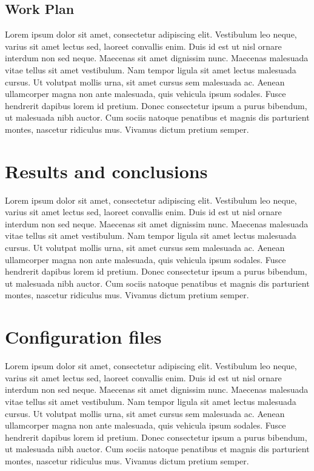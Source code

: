 \documentclass[12pt,twoside,openright,english,spanish]{toptesi}
\begin{document}
\section{Work Plan}
Lorem ipsum dolor sit amet, consectetur adipiscing elit. Vestibulum leo neque, varius sit amet lectus sed, laoreet convallis enim. Duis id est ut nisl ornare interdum non sed neque. Maecenas sit amet dignissim nunc. Maecenas malesuada vitae tellus sit amet vestibulum. Nam tempor ligula sit amet lectus malesuada cursus. Ut volutpat mollis urna, sit amet cursus sem malesuada ac. Aenean ullamcorper magna non ante malesuada, quis vehicula ipsum sodales. Fusce hendrerit dapibus lorem id pretium. Donec consectetur ipsum a purus bibendum, ut malesuada nibh auctor. Cum sociis natoque penatibus et magnis dis parturient montes, nascetur ridiculus mus. Vivamus dictum pretium semper.


\chapter{Results and conclusions}
Lorem ipsum dolor sit amet, consectetur adipiscing elit. Vestibulum leo neque, varius sit amet lectus sed, laoreet convallis enim. Duis id est ut nisl ornare interdum non sed neque. Maecenas sit amet dignissim nunc. Maecenas malesuada vitae tellus sit amet vestibulum. Nam tempor ligula sit amet lectus malesuada cursus. Ut volutpat mollis urna, sit amet cursus sem malesuada ac. Aenean ullamcorper magna non ante malesuada, quis vehicula ipsum sodales. Fusce hendrerit dapibus lorem id pretium. Donec consectetur ipsum a purus bibendum, ut malesuada nibh auctor. Cum sociis natoque penatibus et magnis dis parturient montes, nascetur ridiculus mus. Vivamus dictum pretium semper.


\appendix
\chapter{Configuration files}
Lorem ipsum dolor sit amet, consectetur adipiscing elit. Vestibulum leo neque, varius sit amet lectus sed, laoreet convallis enim. Duis id est ut nisl ornare interdum non sed neque. Maecenas sit amet dignissim nunc. Maecenas malesuada vitae tellus sit amet vestibulum. Nam tempor ligula sit amet lectus malesuada cursus. Ut volutpat mollis urna, sit amet cursus sem malesuada ac. Aenean ullamcorper magna non ante malesuada, quis vehicula ipsum sodales. Fusce hendrerit dapibus lorem id pretium. Donec consectetur ipsum a purus bibendum, ut malesuada nibh auctor. Cum sociis natoque penatibus et magnis dis parturient montes, nascetur ridiculus mus. Vivamus dictum pretium semper.
\end{document}
